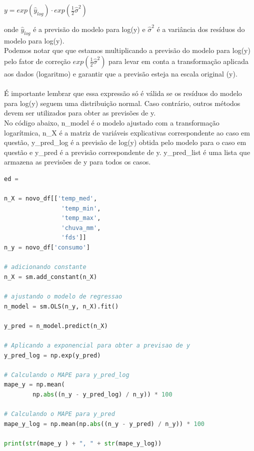 \documentclass[a4paper, 12pt]{article}
\begin{document}
$y = exp(\hat{y}_{log}) \cdot exp(\frac{1}{2}\hat{\sigma}^2)$

onde $\hat{y}_{log}$ é a previsão do modelo para log(y) e $\hat{\sigma}^2$ é a variância dos resíduos do modelo para log(y).\\

Podemos notar que que estamos multiplicando a previsão do modelo para log(y) pelo fator de correção $exp(\frac{1}{2}\hat{\sigma}^2)$ para levar em conta a transformação aplicada aos dados (logaritmo) e garantir que a previsão esteja na escala original (y).\\ \\

É importante lembrar que essa expressão só é válida se os resíduos do modelo para log(y) seguem uma distribuição normal. Caso contrário, outros métodos devem ser utilizados para obter as previsões de y.\\

No código abaixo, n\_model é o modelo ajustado com a transformação logarítmica, n\_X é a matriz de variáveis explicativas correspondente ao caso em questão, y\_pred\_log é a previsão de log(y) obtida pelo modelo para o caso em questão e y\_pred é a previsão correspondente de y. y\_pred\_list é uma lista que armazena as previsões de y para todos os casos.\\

\begin{tcolorbox}[colback=white,boxrule=1pt,arc=5pt,auto outer arc]
  \begin{lstlisting}[language=Python]ed = 

n_X = novo_df[['temp_med', 
                'temp_min', 
                'temp_max',
                'chuva_mm',
                'fds']]
n_y = novo_df['consumo']

# adicionando constante
n_X = sm.add_constant(n_X)

# ajustando o modelo de regressao
n_model = sm.OLS(n_y, n_X).fit()

y_pred = n_model.predict(n_X)

# Aplicando a exponencial para obter a previsao de y
y_pred_log = np.exp(y_pred)

# Calculando o MAPE para y_pred_log
mape_y = np.mean(
        np.abs((n_y - y_pred_log) / n_y)) * 100
        
# Calculando o MAPE para y_pred
mape_y_log = np.mean(np.abs((n_y - y_pred) / n_y)) * 100

print(str(mape_y ) + ", " + str(mape_y_log))

    \end{lstlisting}
\end{tcolorbox} \\
\end{document}
